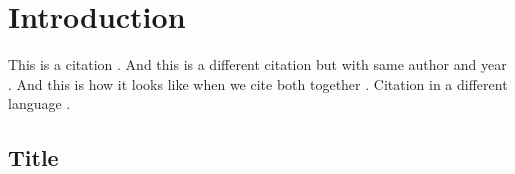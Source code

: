 \chapter{Introduction}

This is a citation \citep{malchukov2015}. And this is a different citation but with same author and year \citep{malchukov2015a}. And this is how it looks like when we cite both together \citep{malchukov2015, malchukov2015a}. Citation in a different language \citep{yuan2010}.
\section{Title}
\Blindtext
